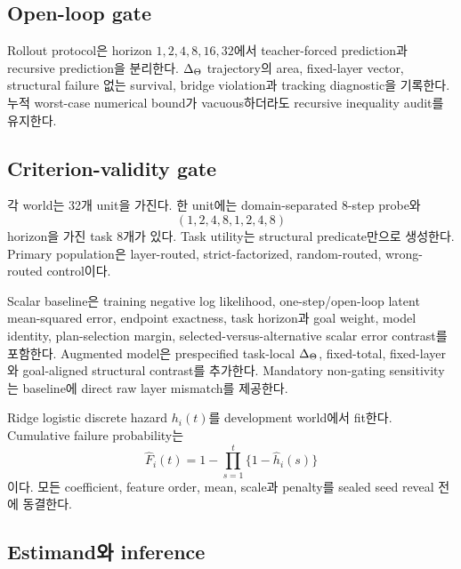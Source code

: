 \subsection{Open-loop gate}

Rollout protocol은 horizon \(1,2,4,8,16,32\)에서 teacher-forced prediction과
recursive prediction을 분리한다. \(\Delta_{\Theta}\) trajectory의 area,
fixed-layer vector, structural failure 없는 survival, bridge violation과
tracking diagnostic을 기록한다. 누적 worst-case numerical bound가
vacuous하더라도 recursive inequality audit를 유지한다.

\subsection{Criterion-validity gate}

각 world는 32개 unit을 가진다. 한 unit에는 domain-separated 8-step probe와
\[
(1,2,4,8,1,2,4,8)
\]
horizon을 가진 task 8개가 있다. Task utility는 structural predicate만으로
생성한다. Primary population은 layer-routed, strict-factorized,
random-routed, wrong-routed control이다.

Scalar baseline은 training negative log likelihood, one-step/open-loop latent
mean-squared error, endpoint exactness, task horizon과 goal weight, model
identity, plan-selection margin, selected-versus-alternative scalar error
contrast를 포함한다. Augmented model은 prespecified task-local
\(\Delta_{\Theta}\), fixed-total, fixed-layer와 goal-aligned structural contrast를
추가한다. Mandatory non-gating sensitivity는 baseline에 direct raw layer
mismatch를 제공한다.

Ridge logistic discrete hazard \(h_i(t)\)를 development world에서 fit한다.
Cumulative failure probability는
\[
\widehat F_i(t)
=1-\prod_{s=1}^{t}\{1-\widehat h_i(s)\}
\]
이다. 모든 coefficient, feature order, mean, scale과 penalty를 sealed seed
reveal 전에 동결한다.

\subsection{Estimand와 inference}


